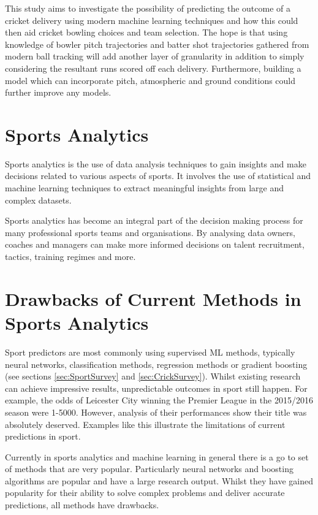 \documentclass[12pt,a4paper]{report}
\theoremstyle{definition}
\begin{document}
This study aims to investigate the possibility of predicting the outcome of a cricket delivery using modern machine learning techniques and how this could then aid cricket bowling choices and team selection. 
The hope is that using knowledge of bowler pitch trajectories and batter shot trajectories gathered from modern ball tracking will add another layer of granularity in addition to simply considering the resultant runs scored off each delivery. 
Furthermore, building a model which can incorporate pitch, atmospheric and ground conditions could further improve any models. 

\section{Sports Analytics}

Sports analytics is the use of data analysis techniques to gain insights and make decisions related to various aspects of sports.
It involves the use of statistical and machine learning techniques to extract meaningful insights from large and complex datasets.

Sports analytics has become an integral part of the decision making process for many professional sports teams and organisations. 
By analysing data owners, coaches and managers can make more informed decisions on talent recruitment, tactics, training regimes and more.

\section{Drawbacks of Current Methods in Sports Analytics}
 
Sport predictors are most commonly using supervised ML methods, typically neural networks, classification methods, regression methods or gradient boosting \citep{horvat2020} (see sections \ref{sec:SportSurvey} and \ref{sec:CrickSurvey}).
Whilst existing research can achieve impressive results, unpredictable outcomes in sport still happen. For example, the odds of Leicester City winning the Premier League in the 2015/2016 season were 1-5000. 
However, analysis of their performances show their title was absolutely deserved.
Examples like this illustrate the limitations of current predictions in sport.

Currently in sports analytics and machine learning in general there is a go to set of methods that are very popular.
Particularly neural networks and boosting algorithms are popular and have a large research output.
Whilst they have gained popularity for their ability to solve complex problems and deliver accurate predictions, all methods have drawbacks.
\end{document}
